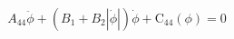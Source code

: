 \begin{equation}
A_{44} \ddot{\phi} + \left(B_{1} + B_{2} \left|{\dot{\phi}}\right|\right) \dot{\phi} + \operatorname{C_{44}}\left(\phi\right) = 0
\end{equation}

